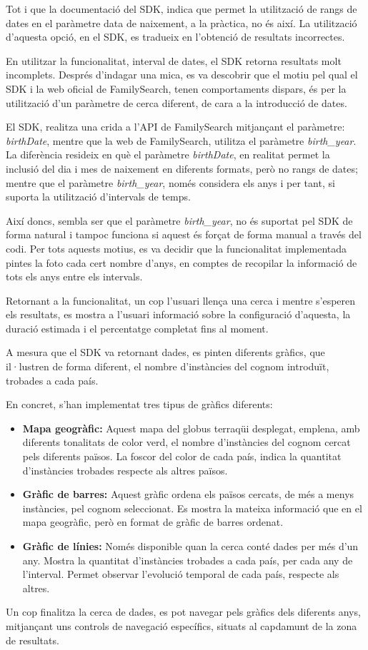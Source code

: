     Tot i que la documentació del SDK, indica que permet la utilització de rangs de dates en el paràmetre data de naixement, a la pràctica, no és així. La utilització d'aquesta opció, en el SDK, es tradueix en l’obtenció de resultats incorrectes.

    En utilitzar la funcionalitat, interval de dates, el SDK retorna resultats molt incomplets. Després d'indagar una mica, es va descobrir que el motiu pel qual el SDK i la web oficial de FamilySearch, tenen comportaments dispars, és per la utilització d’un paràmetre de cerca diferent, de cara a la introducció de dates.

    El SDK, realitza una crida a l'API de FamilySearch mitjançant el paràmetre: \emph{birthDate}, mentre que la web de FamilySearch, utilitza el paràmetre \emph{birth\_year}. La diferència resideix en què el paràmetre \emph{birthDate}, en realitat permet la inclusió del dia i mes de naixement en diferents formats, però no rangs de dates; mentre que el paràmetre \emph{birth\_year}, només considera els anys i per tant, si suporta la utilització d’intervals de temps.

    Així doncs, sembla ser que el paràmetre \emph{birth\_year}, no és suportat pel SDK de forma natural i tampoc funciona si aquest és forçat de forma manual a través del codi. Per tots aquests motius, es va decidir que la funcionalitat implementada pintes la foto cada cert nombre d'anys, en comptes de recopilar la informació de tots els anys entre els intervals.

    Retornant a la funcionalitat, un cop l’usuari llença una cerca i mentre s'esperen els resultats, es mostra a l'usuari informació sobre la configuració d'aquesta, la duració estimada i el percentatge completat fins al moment.

    A mesura que el SDK va retornant dades, es pinten diferents gràfics, que il·lustren de forma diferent, el nombre d'instàncies del cognom introduït, trobades a cada país.

    En concret, s’han implementat tres tipus de gràfics diferents:

    \begin{itemize}
        \item \textbf{Mapa geogràfic:} Aquest mapa del globus terraqüi desplegat, emplena, amb diferents tonalitats de color verd, el nombre d’instàncies del cognom cercat pels diferents països. La foscor del color de cada país, indica la quantitat d'instàncies trobades respecte als altres països.
        \item \textbf{Gràfic de barres:} Aquest gràfic ordena els països cercats, de més a menys instàncies, pel cognom seleccionat. Es mostra la mateixa informació que en el mapa geogràfic, però en format de gràfic de barres ordenat.
        \item \textbf{Gràfic de línies:} Només disponible quan la cerca conté dades per més d'un any. Mostra la quantitat d'instàncies trobades a cada país, per cada any de l’interval. Permet observar l'evolució temporal de cada país, respecte als altres.
    \end{itemize}

    Un cop finalitza la cerca de dades, es pot navegar pels gràfics dels diferents anys, mitjançant uns controls de navegació específics, situats al capdamunt de la zona de resultats.
